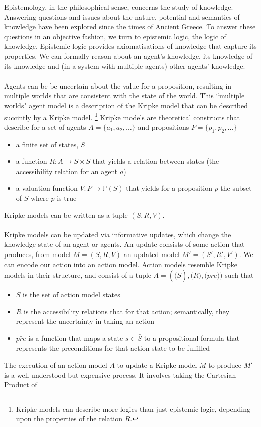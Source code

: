 \documentclass[12pt, a4paper]{article}
\begin{document}
Epistemology, in the philosophical sense, concerns the study of knowledge.
Answering questions and issues about the nature, potential and semantics of knowledge have been explored since the times of Ancient Greece.
To answer these questions in an objective fashion, we turn to epistemic logic, the logic of knowledge.
Epistemic logic provides axiomatisations of knowledge that capture its properties.
We can formally reason about an agent's knowledge, its knowledge of its knowledge and (in a system with multiple agents) other agents' knowledge.\\
\\
Agents can be be uncertain about the value for a proposition, resulting in multiple worlds that are consistent with the state of the world.
This ``multiple worlds" agent model is a description of the Kripke model that can be described succintly by a Kripke model. \footnote{Kripke models can describe more logics than just epistemic logic, depending upon the properties of the relation $R$.}
Kripke models are theoretical constructs that describe for a set of agents $A = \{a_1, a_2, \ldots\}$ and propositions $P = \{p_1, p_2, \ldots \}$
\begin{itemize}
  \item a finite set of states, $S$
  \item a function $R: A \to S \times S$ that yields a relation between states (the accessibility relation for an agent $a$)
  \item a valuation function $V: P \to \mathbb{P}(S)$ that yields for a proposition $p$ the subset of $S$ where $p$ is true
\end{itemize}
Kripke models can be written as a tuple $(S, R, V)$.\\
\\
Kripke models can be updated via informative updates, which change the knowledge state of an agent or agents.
An update consists of some action that produces, from model $M = (S, R, V)$ an updated model $M' = (S', R', V')$.
We can encode our action into an action model.
Action models resemble Kripke models in their structure, and consist of a tuple $A = (\bar(S), \bar(R), \bar(pre))$ such that
\begin{itemize}
  \item $\bar{S}$ is the set of action model states
  \item $\bar{R}$ is the accessibility relations that for that action; semantically, they represent the uncertainty in taking an action
  \item $\bar{pre}$ is a function that maps a state $s \in \bar{S}$ to a propositional formula that represents the preconditions for that action state to be fulfilled
\end{itemize}
The execution of an action model $A$ to update a Kripke model $M$ to produce $M'$ is a well-understood but expensive process.
It involves taking the Cartesian Product of 
\end{document}
